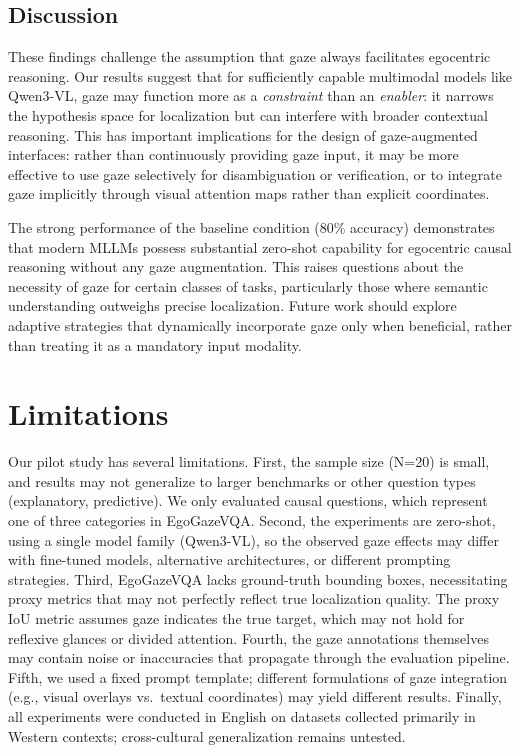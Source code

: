 \documentclass[11pt]{article}
\begin{document}
\subsection{Discussion}
These findings challenge the assumption that gaze always facilitates egocentric reasoning. Our results suggest that for sufficiently capable multimodal models like Qwen3-VL, gaze may function more as a \emph{constraint} than an \emph{enabler}: it narrows the hypothesis space for localization but can interfere with broader contextual reasoning. This has important implications for the design of gaze-augmented interfaces: rather than continuously providing gaze input, it may be more effective to use gaze selectively for disambiguation or verification, or to integrate gaze implicitly through visual attention maps rather than explicit coordinates.

The strong performance of the baseline condition (80\% accuracy) demonstrates that modern MLLMs possess substantial zero-shot capability for egocentric causal reasoning without any gaze augmentation. This raises questions about the necessity of gaze for certain classes of tasks, particularly those where semantic understanding outweighs precise localization. Future work should explore adaptive strategies that dynamically incorporate gaze only when beneficial, rather than treating it as a mandatory input modality.

\section{Limitations}
Our pilot study has several limitations. First, the sample size (N=20) is small, and results may not generalize to larger benchmarks or other question types (explanatory, predictive). We only evaluated causal questions, which represent one of three categories in EgoGazeVQA. Second, the experiments are zero-shot, using a single model family (Qwen3-VL), so the observed gaze effects may differ with fine-tuned models, alternative architectures, or different prompting strategies. Third, EgoGazeVQA lacks ground-truth bounding boxes, necessitating proxy metrics that may not perfectly reflect true localization quality. The proxy IoU metric assumes gaze indicates the true target, which may not hold for reflexive glances or divided attention. Fourth, the gaze annotations themselves may contain noise or inaccuracies that propagate through the evaluation pipeline. Fifth, we used a fixed prompt template; different formulations of gaze integration (e.g., visual overlays vs.\ textual coordinates) may yield different results. Finally, all experiments were conducted in English on datasets collected primarily in Western contexts; cross-cultural generalization remains untested.
\end{document}

